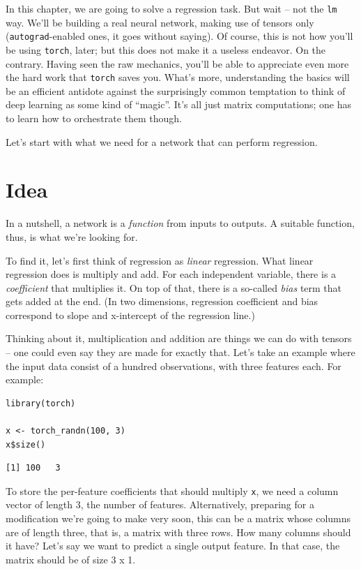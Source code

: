 \documentclass[
  letterpaper,
]{krantz}
\begin{document}
In this chapter, we are going to solve a regression
task. But wait -- not the \texttt{lm} way. We'll be building a real
neural network, making use of tensors only (\texttt{autograd}-enabled
ones, it goes without saying). Of course, this is not how you'll be
using \texttt{torch}, later; but this does not make it a useless
endeavor. On the contrary. Having seen the raw mechanics, you'll be able
to appreciate even more the hard work that \texttt{torch} saves you.
What's more, understanding the basics will be an efficient antidote
against the surprisingly common temptation to think of deep learning as
some kind of ``magic''. It's all just matrix computations; one has to
learn how to orchestrate them though.

Let's start with what we need for a network that can perform regression.

\hypertarget{idea}{%
\section{Idea}\label{idea}}

In a nutshell, a network is a \emph{function} from inputs to outputs. A
suitable function, thus, is what we're looking for.

To find it, let's first think of regression as \emph{linear} regression.
What linear regression does is multiply and add. For each independent
variable, there is a \emph{coefficient} that multiplies it. On top of
that, there is a so-called \emph{bias} term that gets added at the end.
(In two dimensions, regression coefficient and bias correspond to slope
and x-intercept of the regression line.)

Thinking about it, multiplication and addition are things we can do with
tensors -- one could even say they are made for exactly that. Let's take
an example where the input data consist of a hundred observations, with
three features each. For example:

\begin{verbatim}
library(torch)

x <- torch_randn(100, 3)
x$size()
\end{verbatim}

\begin{verbatim}
[1] 100   3
\end{verbatim}

To store the per-feature coefficients that should multiply \texttt{x},
we need a column vector of length 3, the number of features.
Alternatively, preparing for a modification we're going to make very
soon, this can be a matrix whose columns are of length three, that is, a
matrix with three rows. How many columns should it have? Let's say we
want to predict a single output feature. In that case, the matrix should
be of size 3 x 1.
\end{document}
